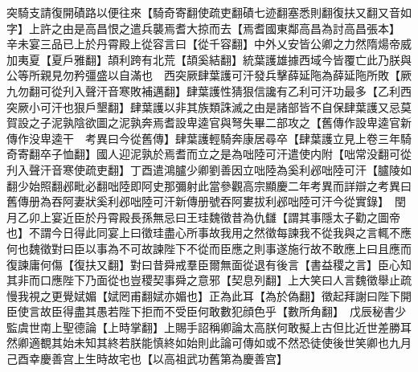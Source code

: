 突騎支請復開磧路以便往來【騎奇寄翻使疏吏翻磧七迹翻塞悉則翻復扶又翻又音如字】上許之由是高昌恨之遣兵襲焉耆大掠而去【焉耆國東鄰高昌為討高昌張本】　辛未宴三品已上於丹霄殿上從容言曰【從千容翻】中外乂安皆公卿之力然隋煬帝威加夷夏【夏戶雅翻】頡利跨有北荒【頡奚結翻】統葉護雄據西域今皆覆亡此乃朕與公等所親見勿矜彊盛以自滿也　西突厥肆葉護可汗發兵擊薛延陁為薛延陁所敗【厥九勿翻可從刋入聲汗音寒敗補邁翻】肆葉護性猜狠信讒有乙利可汗功最多【乙利西突厥小可汗也狠戶墾翻】肆葉護以非其族類誅滅之由是諸部皆不自保肆葉護又忌莫賀設之子泥孰陰欲圖之泥孰奔焉耆設卑逵官與弩失畢二部攻之【舊傳作設卑逵官新傳作没卑逵干　考異曰今從舊傳】肆葉護輕騎奔康居尋卒【肆葉護立見上卷三年騎奇寄翻卒子恤翻】國人迎泥孰於焉耆而立之是為咄陸可汗遣使内附【咄常没翻可從刋入聲汗音寒使疏吏翻】丁酉遣鴻臚少卿劉善因立咄陸為奚利邲咄陸可汗【臚陵如翻少始照翻邲毗必翻咄陸即阿史那彌射此當參觀高宗顯慶二年考異而詳辯之考異曰舊傳册為吞阿妻狀奚利邲咄陸可汗新傳册號吞阿婁拔利邲咄陸可汗今從實錄】　閏月乙卯上宴近臣於丹霄殿長孫無忌曰王珪魏徵昔為仇讎【謂其事隱太子勸之圖帝也】不謂今日得此同宴上曰徵珪盡心所事故我用之然徵每諫我不從我與之言輒不應何也魏徵對曰臣以事為不可故諫陛下不從而臣應之則事遂施行故不敢應上曰且應而復諫庸何傷【復扶又翻】對曰昔舜戒羣臣爾無面從退有後言【書益稷之言】臣心知其非而口應陛下乃面從也豈稷契事舜之意邪【契息列翻】上大笑曰人言魏徵舉止疏慢我視之更覺娬媚【娬罔甫翻娬亦媚也】正為此耳【為於偽翻】徵起拜謝曰陛下開臣使言故臣得盡其愚若陛下拒而不受臣何敢數犯顔色乎【數所角翻】　戊辰秘書少監虞世南上聖德論【上時掌翻】上賜手詔稱卿論太高朕何敢擬上古但比近世差勝耳然卿適覩其始未知其終若朕能慎終如始則此論可傳如或不然恐徒使後世笑卿也九月己酉幸慶善宫上生時故宅也【以高祖武功舊第為慶善宫】

